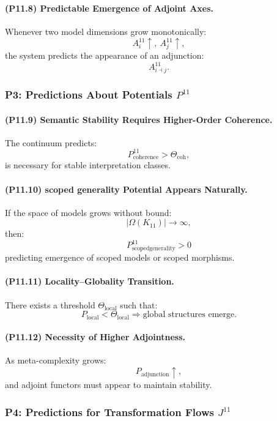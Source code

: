 \paragraph{(P11.8) Predictable Emergence of Adjoint Axes.}
Whenever two model dimensions grow monotonically:
\[
A_i^{11} \uparrow,\
A_j^{11} \uparrow,
\]
the system predicts the appearance of an adjunction:
\[
A_{i \dashv j}^{11}.
\]

\subsubsection{P3: Predictions About Potentials $P^{11}$}

\paragraph{(P11.9) Semantic Stability Requires Higher-Order Coherence.}
The continuum predicts:
\[
P_{\mathrm{coherence}}^{11} > \Theta_{\mathrm{coh}},
\]
is necessary for stable interpretation classes.

\paragraph{(P11.10) scoped generality Potential Appears Naturally.}
If the space of models grows without bound:
\[
|\Omega(K_{11})| \to \infty,
\]
then:
\[
P_{\mathrm{scoped generality}}^{11} > 0
\]
predicting emergence of scoped models or scoped morphisms.

\paragraph{(P11.11) Locality–Globality Transition.}
There exists a threshold $\Theta_{\mathrm{local}}$ such that:
\[
P_{\mathrm{local}} < \Theta_{\mathrm{local}}
\Rightarrow
\text{global structures emerge}.
\]

\paragraph{(P11.12) Necessity of Higher Adjointness.}
As meta-complexity grows:
\[
P_{\mathrm{adjunction}} \uparrow,
\]
and adjoint functors must appear to maintain stability.

\subsubsection{P4: Predictions for Transformation Flows $J^{11}$}

